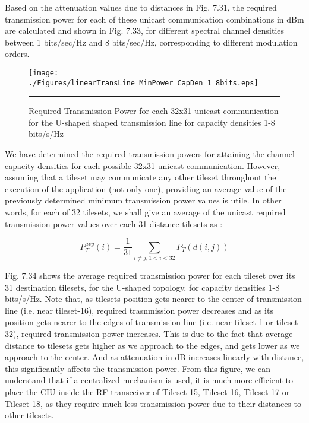 

Based on the attenuation values due to distances in Fig. 7.31, the required transmission power for each of these unicast communication combinations in dBm are calculated and shown in Fig. 7.33, for different spectral channel densities between 1 bits/sec/Hz and 8 bits/sec/Hz, corresponding to different modulation orders. 

\begin{figure}[H]
  \centering
    \texttt{[image: ./Figures/linearTransLine\_MinPower\_CapDen\_1\_8bits.eps]}
    \rule{35em}{0.5pt}
  \caption[Required Transmission Power for each 32x31 unicast communication for the U-shaped shaped transmission line for capacity densities 1-8 bits/s/Hz]{Required Transmission Power for each 32x31 unicast communication for the U-shaped shaped transmission line for capacity densities 1-8 bits/s/Hz}
  \label{fig:Electron}
\end{figure}

We have determined the required transmission powers for attaining the channel capacity densities for each possible 32x31 unicast communication. However, assuming that a tileset may communicate any other tileset throughout the execution of the application (not only one), providing an average value of the previously determined minimum transmission power values is utile. In other words, for each of 32 tilesets, we shall give an average of the unicast required transmission power values over each 31 distance tilesets as :

\begin{equation}
P_{T}^{avg}(i) = \frac{1}{31} \sum_{i \neq j, 1<i<32}^{}    P_{T}(d(i,j))
\end{equation}

Fig. 7.34 shows the average required transmission power for each tileset over its 31 destination tilesets, for the U-shaped topology, for capacity densities 1-8 bits/s/Hz. Note that, as tilesets position gets nearer to the center of transmission line (i.e. near tileset-16), required trasnmission power decreases and as its position gets nearer to the edges of transmission line (i.e. near tileset-1 or tileset-32), required transmission power increases. This is due to the fact that average distance to tilesets gets higher as we approach to the edges, and gets lower as we approach to the center. And as attenuation in dB increases linearly with distance, this significantly affects the transmission power. From this figure, we can understand that if a centralized mechanism is used, it is much more efficient to place the CIU inside the RF transceiver of Tileset-15, Tileset-16, Tileset-17 or Tileset-18, as they require much less transmission power due to their distances to other tilesets. 
    

